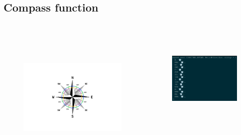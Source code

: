 \subsection{Compass function}
\begin{frame}
    \begin{columns}[t]
        \begin{column}{.4\textwidth}
        \vspace{-0.5cm}
        \hspace{-3cm}
            \begin{figure}
                \centering
                \includegraphics[height = 7cm]{images/compass.png}%
            \end{figure}
        \end{column}
        \hspace{1cm}
        \begin{column}{.6\textwidth}
            \vspace{0.5cm}
            \begin{figure}
                \centering
                \includegraphics[height = 5cm]{images/directionCode.png}%
            \end{figure}
        \end{column}
    \end{columns}
    
\end{frame}